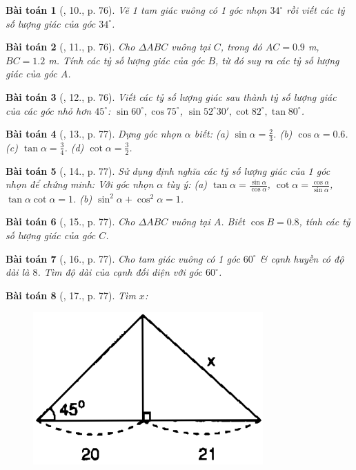 \documentclass{article}
\newtheorem{baitoan}{Bài toán}
\begin{document}
\begin{baitoan}[\cite{SGK_Toan_9_tap_1}, 10., p. 76]
	Vẽ 1 tam giác vuông có 1 góc nhọn $34^\circ$ rồi viết các tỷ số lượng giác của góc $34^\circ$.
\end{baitoan}

\begin{baitoan}[\cite{SGK_Toan_9_tap_1}, 11., p. 76]
	Cho $\Delta ABC$ vuông tại $C$, trong đó $AC = 0.9$ {\rm m}, $BC = 1.2$ {\rm m}. Tính các tỷ số lượng giác của góc $B$, từ đó suy ra các tỷ số lượng giác của góc $A$.
\end{baitoan}

\begin{baitoan}[\cite{SGK_Toan_9_tap_1}, 12., p. 76]
	Viết các tỷ số lượng giác sau thành tỷ số lượng giác của các góc nhỏ hơn $45^\circ$: $\sin60^\circ,\cos75^\circ$, $\sin52^\circ30',\cot82^\circ,\tan80^\circ$.
\end{baitoan}

\begin{baitoan}[\cite{SGK_Toan_9_tap_1}, 13., p. 77]
	Dựng góc nhọn $\alpha$ biết: (a) $\sin\alpha = \frac{2}{3}$. (b) $\cos\alpha = 0.6$. (c) $\tan\alpha = \frac{3}{4}$. (d) $\cot\alpha = \frac{3}{2}$.
\end{baitoan}

\begin{baitoan}[\cite{SGK_Toan_9_tap_1}, 14., p. 77]
	Sử dụng định nghĩa các tỷ số lượng giác của 1 góc nhọn để chứng minh: Với góc nhọn $\alpha$ tùy ý: (a) $\tan\alpha = \frac{\sin\alpha}{\cos\alpha}$, $\cot\alpha = \frac{\cos\alpha}{\sin\alpha}$, $\tan\alpha\cot\alpha = 1$. (b) $\sin^2\alpha + \cos^2\alpha = 1$.
\end{baitoan}

\begin{baitoan}[\cite{SGK_Toan_9_tap_1}, 15., p. 77]
	Cho $\Delta ABC$ vuông tại $A$. Biết $\cos B = 0.8$, tính các tỷ số lượng giác của góc $C$.
\end{baitoan}

\begin{baitoan}[\cite{SGK_Toan_9_tap_1}, 16., p. 77]
	Cho tam giác vuông có 1 góc $60^\circ$ \& cạnh huyền có độ dài là $8$. Tìm độ dài của cạnh đối diện với góc $60^\circ$.
\end{baitoan}

\begin{baitoan}[\cite{SGK_Toan_9_tap_1}, 17., p. 77]
	Tìm $x$:
	\begin{figure}[H]
		\centering
		\includegraphics[scale=.25]{SGK_Toan_9_23_p77}
	\end{figure}
\end{baitoan}
\end{document}
